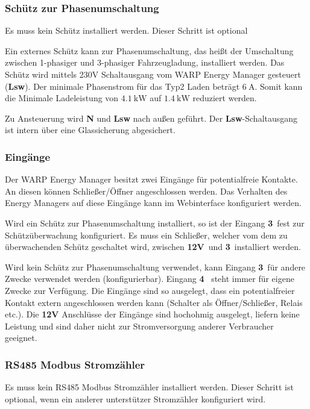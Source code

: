 \documentclass[a4paper,10pt]{article}
\newcommand{\hint}[1]{\begin{tcolorbox}[colback=boxgray,colframe=black,coltext=
white,title=Hinweis,left*=2mm,right*=2mm,boxsep=1mm,bottom=1mm,top=1mm]#1\end{tcolorbox}}
\begin{document}
\begin{multicols*}{2}
	\subsubsection{Schütz zur Phasenumschaltung}
	\hint{Es muss kein Schütz installiert werden. Dieser Schritt ist optional}

	Ein externes Schütz kann zur Phasenumschaltung, das heißt der Umschaltung
	zwischen 1-phasiger und 3-phasiger Fahrzeugladung, installiert werden. Das
	Schütz wird mittels 230V Schaltausgang vom WARP Energy Manager gesteuert
	(\textbf{Lsw}).
	Der minimale Phasenstrom für das Typ2 Laden beträgt $\SI{6}{\ampere}$. Somit
	kann die Minimale Ladeleistung von $\SI{4.1}{\kilo\watt}$ auf
	$\SI{1.4}{\kilo\watt}$ reduziert werden.

	Zu Ansteuerung wird \textbf{N} und \textbf{Lsw} nach außen geführt. Der
	\textbf{Lsw}-Schaltausgang ist intern über eine Glassicherung abgesichert.


	\subsubsection{Eingänge}
	Der WARP Energy Manager besitzt zwei Eingänge für potentialfreie Kontakte.
	An diesen können Schließer/Öffner angeschlossen werden. Das Verhalten des
	Energy Managers auf diese Eingänge kann im Webinterface konfiguriert werden.
	
	Wird ein Schütz zur Phasenumschaltung installiert, so ist der Eingang
	\textbf{3}~fest zur
	Schützüberwachung konfiguriert. Es muss ein Schließer, welcher vom
	dem zu überwachenden Schütz geschaltet wird, zwischen \textbf{12V}~und
	\textbf{3}~installiert werden.

	Wird kein Schütz zur Phasenumschaltung verwendet, kann Eingang \textbf{3}~für
	andere Zwecke verwendet werden (konfigurierbar). Eingang \textbf{4}~ steht immer
	für eigene Zwecke zur Verfügung. Die Eingänge sind so ausgelegt, dass ein potentialfreier
	Kontakt extern angeschlossen werden kann (Schalter als Öffner/Schließer, Relais etc.).
	Die \textbf{12V} Anschlüsse der Eingänge sind hochohmig ausgelegt, liefern
	keine Leistung und sind daher nicht zur Stromversorgung anderer Verbraucher
	geeignet.

	\subsubsection{RS485 Modbus Stromzähler}
	\hint{Es muss kein RS485 Modbus Stromzähler installiert werden. Dieser
	Schritt ist optional, wenn ein anderer unterstützer Stromzähler konfiguriert
	wird.}


\end{multicols*}
\end{document}

